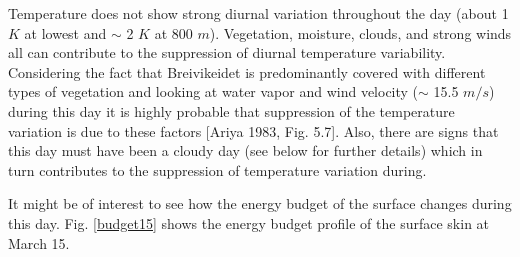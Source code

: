 \documentclass[a4paper,12pt]{article}
\numberwithin{equation}{section} %
\begin{document}
Temperature does not show strong diurnal variation throughout the day (about 1 $K$ at lowest and $\sim$ 2 $K$ at 800 $m$). Vegetation, moisture, clouds, and strong winds all can contribute to the suppression of diurnal temperature variability. Considering the fact that Breivikeidet is predominantly covered with different types of vegetation and looking at water vapor and wind velocity ($\sim$ 15.5 $m/s$) during this day it is highly probable that suppression of the temperature variation is due to these factors [Ariya 1983, Fig. 5.7]. Also, there are signs that this day must have been a cloudy day (see below for further details) which in turn contributes to the suppression of temperature variation during.


It might be of interest to see how the energy budget of the surface changes during this day. Fig. \ref{budget15} shows the energy budget profile of the surface skin at March 15.
\end{document}
